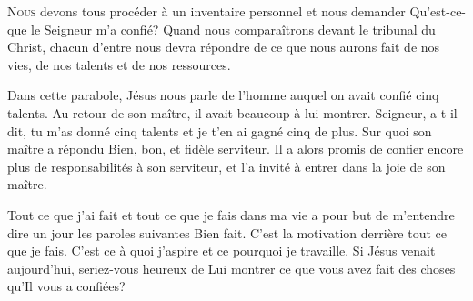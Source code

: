 

\lettrine{N}{ous} devons tous procéder à un inventaire personnel
 et nous demander\frcolon{} 
 \Og Qu'est-ce-que le Seigneur m'a confié? \Fg{}
 Quand nous comparaîtrons devant le tribunal du Christ,
 chacun d'entre nous devra répondre de ce que nous aurons fait de nos vies,
 de nos talents et de nos ressources. 


Dans cette parabole, Jésus nous parle de l'homme auquel on avait confié
 cinq talents. Au retour de son maître, il avait beaucoup à lui montrer.
 \Og Seigneur, a-t-il dit, 
 tu m'as donné cinq talents et je t'en ai gagné cinq de plus. \Fg{}
 Sur quoi son maître a répondu\frcolon{} 
 \Og Bien, bon, et fidèle serviteur. \Fg{}
 Il a alors promis de confier encore plus de responsabilités à son serviteur,
 et l'a invité à entrer dans \Og la joie de son maître. \Fg{}

Tout ce que j'ai fait et tout ce que je fais dans ma vie
 a pour but de m'entendre dire un jour les paroles suivantes\frcolon{} 
 \Og Bien fait. \Fg{} 
 C'est la motivation derrière tout ce que je fais.
 C'est ce à quoi j'aspire et ce pourquoi je travaille.
 Si Jésus venait aujourd'hui, seriez-vous heureux de Lui montrer
 ce que vous avez fait des choses qu'Il vous a confiées? 

\dvrule






